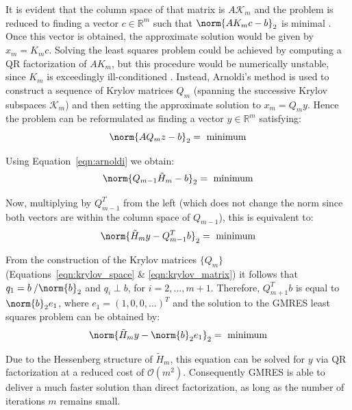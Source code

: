 \noindent It is evident that the column space of that matrix is $A\mathcal{K}_m$ and the problem is reduced to finding a vector $c \in \mathbb{R}^{m}$ such that $\norm{AK_mc-b}_2$ is minimal   \cite{trefethen_numerical_1997}. Once this vector is obtained, the approximate solution would be given by $x_m =K_mc$. Solving the least squares problem could be achieved by computing a QR factorization of $AK_m$, but this procedure would be numerically unstable, since $K_m$ is exceedingly ill-conditioned \cite{trefethen_numerical_1997}. Instead, Arnoldi's method is used to construct a sequence of Krylov matrices $Q_m$ (spanning the successive Krylov subspaces $\mathcal{K}_m$) and then setting the approximate solution to $x_m = Q_my$. Hence the problem can be reformulated as finding a vector $y \in \mathbb{R}^m$ satisfying:
\begin{equation}
    \norm{AQ_mz-b}_2=\text{ minimum}
\end{equation}

\noindent Using Equation~\hyperref[eqn:arnoldi]{\ref{eqn:arnoldi}} we obtain:
\begin{equation}
    \norm{Q_{m-1}\tilde{H}_m-b}_2=\text{ minimum}
\end{equation}

\noindent Now, multiplying by $Q^T_{m-1}$ from the left (which does not change the norm since both vectors are within the column space of $Q_{m-1}$), this is equivalent to:
\begin{equation}
    \norm{\tilde{H}_my-Q^T_{m-1}b}_2 = \text{ minimum}
\end{equation}

\noindent From the construction of the Krylov matrices $\{Q_m\}$ (Equations~\hyperref[eqn:krylov_space]{\ref{eqn:krylov_space}} \& \hyperref[eqn:krylov_matrix]{\ref{eqn:krylov_matrix}}) it follows that $q_1=b\:/\norm{b}_2$ and $q_i \perp b$, for $i = 2, \dots, m+1$. Therefore, $Q^T_{m+1}b$ is equal to $\norm{b}_2e_1$, where $e_1=(1,0,0,\dots)^T$ and the solution to the GMRES least squares problem can be obtained by:
\begin{equation}
    \norm{\tilde{H}_my-\norm{b}_2e_1}_2 = \text{ minimum}
\end{equation}

\noindent Due to the Hessenberg structure of $\tilde{H}_m$, this equation can be solved for $y$ via QR factorization at a reduced cost of $\mathcal{O}(m^2)$. Consequently GMRES is able to deliver a much faster solution than direct factorization, as long as the number of iterations $m$ remains small.

